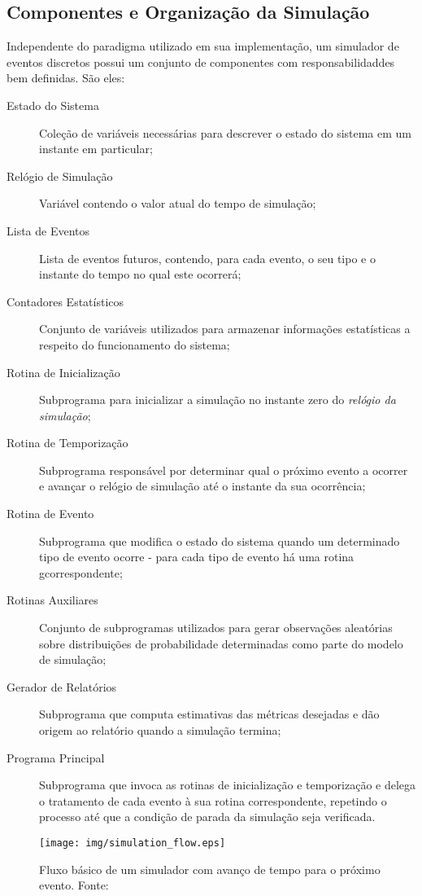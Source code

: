 \subsection{Componentes e Organização da Simulação}

Independente do paradigma utilizado em sua implementação, um simulador de
eventos discretos possui um conjunto de componentes com responsabilidaddes bem
definidas. São eles:

\begin{description}
\item[Estado do Sistema] Coleção de variáveis necessárias para descrever o estado do sistema em um instante em particular;
\item[Relógio de Simulação] Variável contendo o valor atual do tempo de simulação;
\item[Lista de Eventos] Lista de eventos futuros, contendo, para cada evento, o
seu tipo e o instante do tempo no qual este ocorrerá;
\item[Contadores Estatísticos] Conjunto de variáveis utilizados para armazenar informações estatísticas a respeito do funcionamento do sistema;
\item[Rotina de Inicialização] Subprograma para inicializar a simulação no
instante zero do \textit{relógio da simulação};
\item[Rotina de Temporização] Subprograma responsável por determinar qual o
próximo evento a ocorrer e avançar o relógio de simulação até o instante da sua
ocorrência;
\item[Rotina de Evento] Subprograma que modifica o estado do sistema quando um determinado tipo de evento ocorre - para cada tipo de evento há uma rotina
gcorrespondente;
\item[Rotinas Auxiliares] Conjunto de subprogramas utilizados para gerar observações aleatórias sobre distribuições de probabilidade determinadas como parte do modelo de simulação;
\item[Gerador de Relatórios] Subprograma que computa estimativas das métricas desejadas e dão origem ao relatório quando a simulação termina;
\item[Programa Principal] Subprograma que invoca as rotinas de inicialização e temporização e delega o tratamento de cada evento à sua rotina correspondente, repetindo o processo até que a condição de parada da simulação seja verificada.
\end{description}

\begin{figure}[htb!]
\centering\texttt{[image: img/simulation\_flow.eps]}
\caption{\label{fig:simflow}Fluxo básico de um simulador com avanço de tempo para o próximo evento. Fonte:~\cite{Law}}
\end{figure}

